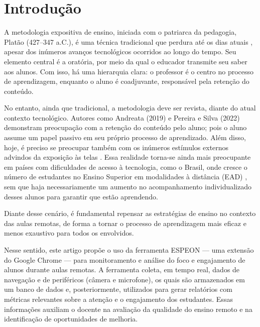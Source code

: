 \section{Introdução}\label{sec:introdução}

A metodologia expositiva de ensino, iniciada com o patriarca da pedagogia, Platão (427–347 a.C.), é uma técnica tradicional que perdura até os dias atuais \cite{ANDREATA2019}, apesar dos inúmeros avanços tecnológicos ocorridos ao longo do tempo. Seu elemento central é a oratória, por meio da qual o educador transmite seu saber aos alunos. Com isso, há uma hierarquia clara: o professor é o centro no processo de aprendizagem, enquanto o aluno é coadjuvante, responsável pela retenção do conteúdo.

No entanto, ainda que tradicional, a metodologia deve ser revista, diante do atual contexto tecnológico. Autores como Andreata (2019) \cite{ANDREATA2019} e Pereira e Silva (2022) \cite{pereira2022critica} demonstram preocupação com a retenção do conteúdo pelo aluno; pois o aluno assume um papel passivo em seu próprio processo de aprendizado. Além disso, hoje, é preciso se preocupar também com os inúmeros estímulos externos advindos da exposição às telas \cite{lopes2017uso}. Essa realidade torna-se ainda mais preocupante em países com dificuldades de acesso à tecnologia, como o Brasil, onde cresce o número de estudantes no Ensino Superior em modalidades à distância (EAD) \cite{moran2009ensino}, sem que haja necessariamente um aumento no acompanhamento individualizado desses alunos para garantir que estão aprendendo. 

Diante desse cenário, é fundamental repensar as estratégias de ensino no contexto das aulas remotas, de forma a tornar o processo de aprendizagem mais eficaz e menos exaustivo para todos os envolvidos.

Nesse sentido, este artigo propõe o uso da ferramenta ESPEON — uma extensão do Google Chrome — para monitoramento e análise do foco e engajamento de alunos durante aulas remotas. A ferramenta coleta, em tempo real, dados de navegação e de periféricos (câmera e microfone), os quais são armazenados em um banco de dados e, posteriormente, utilizados para gerar relatórios com métricas relevantes sobre a atenção e o engajamento dos estudantes. Essas informações auxiliam o docente na avaliação da qualidade do ensino remoto e na identificação de oportunidades de melhoria.
